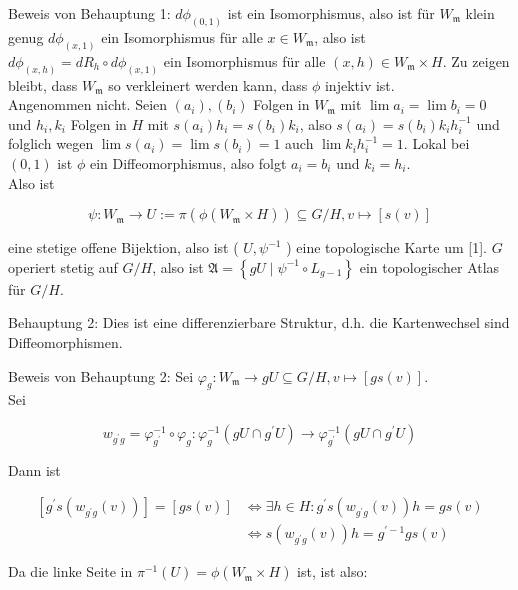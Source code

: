 \documentclass[10pt, letterpaper]{article}
\begin{document}
Beweis von Behauptung 1: $d \phi_{(0,1)}$ ist ein Isomorphismus, also ist für $W_{\mathfrak{m}}$ klein genug $d \phi_{(x, 1)}$ ein Isomorphismus für alle $x \in W_{\mathfrak{m}}$, also ist $d \phi_{(x, h)}=d R_{h} \circ d \phi_{(x, 1)}$ ein Isomorphismus für alle $(x, h) \in W_{\mathfrak{m}} \times H$. Zu zeigen bleibt, dass $W_{\mathfrak{m}}$ so verkleinert werden kann, dass $\phi$ injektiv ist.\\
Angenommen nicht. Seien $\left(a_{i}\right),\left(b_{i}\right)$ Folgen in $W_{\mathfrak{m}}$ mit $\lim a_{i}=\lim b_{i}=0$ und $h_{i}, k_{i}$ Folgen in $H$ mit $s\left(a_{i}\right) h_{i}=s\left(b_{i}\right) k_{i}$, also $s\left(a_{i}\right)=s\left(b_{i}\right) k_{i} h_{i}^{-1}$ und folglich wegen $\lim s\left(a_{i}\right)=\lim s\left(b_{i}\right)=1$ auch $\lim k_{i} h_{i}^{-1}=1$. Lokal bei $(0,1)$ ist $\phi$ ein Diffeomorphismus, also folgt $a_{i}=b_{i}$ und $k_{i}=h_{i}$.\\
Also ist

$$
\psi: W_{\mathfrak{m}} \rightarrow U:=\pi\left(\phi\left(W_{\mathfrak{m}} \times H\right)\right) \subseteq G / H, v \mapsto[s(v)]
$$

eine stetige offene Bijektion, also ist ( $U, \psi^{-1}$ ) eine topologische Karte um [1]. $G$ operiert stetig auf $G / H$, also ist $\mathfrak{A}=\left\{g U \mid \psi^{-1} \circ L_{g-1}\right\}$ ein topologischer Atlas für $G / H$.

Behauptung 2: Dies ist eine differenzierbare Struktur, d.h. die Kartenwechsel sind Diffeomorphismen.

Beweis von Behauptung 2: Sei $\varphi_{g}: W_{\mathfrak{m}} \rightarrow g U \subseteq G / H, v \mapsto[g s(v)]$.\\
Sei

$$
w_{g^{\prime} g}=\varphi_{g^{\prime}}^{-1} \circ \varphi_{g}: \varphi_{g}^{-1}\left(g U \cap g^{\prime} U\right) \rightarrow \varphi_{g^{\prime}}^{-1}\left(g U \cap g^{\prime} U\right)
$$

Dann ist

$$
\begin{aligned}
{\left[g^{\prime} s\left(w_{g^{\prime} g}(v)\right)\right]=[g s(v)] } & \Leftrightarrow \exists h \in H: g^{\prime} s\left(w_{g^{\prime} g}(v)\right) h=g s(v) \\
& \Leftrightarrow s\left(w_{g^{\prime} g}(v)\right) h=g^{\prime-1} g s(v)
\end{aligned}
$$

Da die linke Seite in $\pi^{-1}(U)=\phi\left(W_{\mathfrak{m}} \times H\right)$ ist, ist also:
\end{document}
